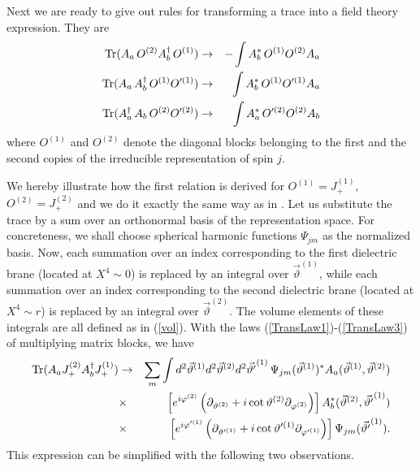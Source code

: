 \documentclass[a4paper,12pt]{article}
\begin{document}
{Next we are ready to give out rules for transforming a trace into a field theory expression. They are 
\begin{eqnarray}
{\rm Tr}(A_{a}\, O^{(2)} A^{\dag}_{b}\, O^{(1)}) & \rightarrow  & 
                              -\int A^{*}_{b}\, O^{(1)} O^{(2)} A_{a}\nonumber\\
{\rm Tr}(A_{a}\,A^{\dag}_{b}\, O^{(1)} O'^{(1)}) & \rightarrow &
                              \int A^{*}_{b}\, O^{(1)} O'^{(1)} A_{a}\nonumber\\
{\rm Tr}(A^{\dag}_{a}\,A_{b}\, O^{(2)} O'^{(2)}) & \rightarrow &
                              \int A^{*}_{a}\, O'^{(2)} O^{(2)} A_{b}
\label{TraceRule}
\end{eqnarray} 
where $O^{(1)}$ and $O^{(2)}$ denote the diagonal blocks belonging to the first and the second copies of the irreducible representation of spin $j$.

We hereby illustrate how the first relation is derived for $O^{(1)} = J^{(1)}_{+}$, 
$O^{(2)} =  J^{(2)}_{+}$ and we do it exactly the same way as in \cite{AB}. Let us substitute the trace by a sum over an orthonormal basis of the representation space. For concreteness, we shall choose spherical harmonic functions $\Psi_{jm}$ as the normalized basis. Now, each summation over an index corresponding to the first dielectric brane (located at $X^{4}\sim 0$) is replaced by an integral over $\vec{\vartheta}^{(1)}$, while each summation over an index corresponding to the second dielectric brane (located at $X^{4}\sim r$) is replaced by an integral over $\vec{\vartheta}^{(2)}$. The volume elements of these integrals are all defined as in (\ref{vol}). With the laws (\ref{TransLaw1})-(\ref{TransLaw3}) of multiplying matrix blocks, we have
\begin{eqnarray}
{\rm Tr}(A_{a}J^{(2)}_{+}A^{\dag}_{b}J^{(1)}_{+}) &\rightarrow &\sum_{m}\int d^{2}\vec{\vartheta}^{(1)}d^{2}\vec{\vartheta}^{(2)}d^{2}\vec{\vartheta'}^{(1)}\,\Psi_{jm}(\vec{\vartheta}^{(1)})^{*}A_{a}(\vec{\vartheta}^{(1)},\vec{\vartheta}^{(2)})\nonumber\\
&\times &\left[e^{i\varphi^{(2)}} \left( \partial_{\vartheta^{(2)}} 
               + i \cot \vartheta^{(2)} \partial_{\varphi^{(2)}}\right)\right]A^{*}_{b}(\vec{\vartheta}^{(2)},\vec{\vartheta'}^{(1)})\nonumber\\
&\times &\left[e^{i\varphi'^{(1)}} \left( \partial_{\vartheta'^{(1)}} 
               + i \cot \vartheta'^{(1)} \partial_{\varphi'^{(1)}}\right)\right]\Psi_{jm}(\vec{\vartheta'}^{(1)}).
\label{tmp}
\end{eqnarray}
This expression can be simplified with the following two observations. 

}
\end{document}
